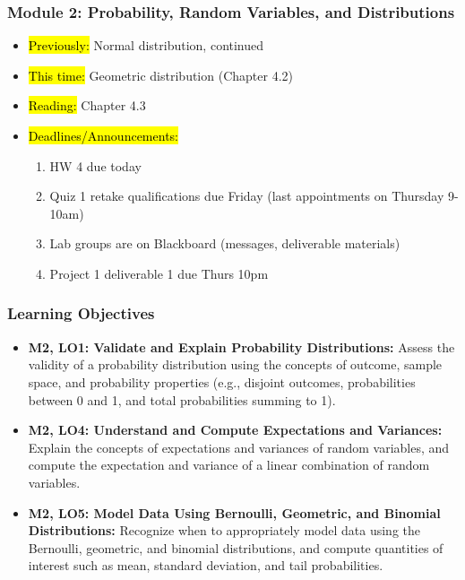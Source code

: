 
\begin{frame}
    \frametitle{Module 2: Probability, Random Variables, and Distributions}
    \begin{itemize}
        \item \hl{Previously: }Normal distribution, continued
        \item \hl{This time: }Geometric distribution (Chapter 4.2)
        \item \hl{Reading: }Chapter 4.3
        \item \hl{Deadlines/Announcements: }
        \begin{enumerate}
            \item HW 4 due today
            \item Quiz 1 retake qualifications due Friday (last appointments on Thursday 9-10am)
            \item Lab groups are on Blackboard (messages, deliverable materials)
            \item Project 1 deliverable 1 due Thurs 10pm
        \end{enumerate}
    \end{itemize}

\end{frame}

\begin{frame}
    \frametitle{Learning Objectives}
    \begin{itemize}
        \item \textbf{M2, LO1: Validate and Explain Probability Distributions:} Assess the validity of a probability distribution using the concepts of outcome, sample space, and probability properties (e.g., disjoint outcomes, probabilities between 0 and 1, and total probabilities summing to 1).
        \item \textbf{M2, LO4: Understand and Compute Expectations and Variances:} Explain the concepts of expectations and variances of random variables, and compute the expectation and variance of a linear combination of random variables.
        \item \textbf{M2, LO5: Model Data Using Bernoulli, Geometric, and Binomial Distributions:} Recognize when to appropriately model data using the Bernoulli, geometric, and binomial distributions, and compute quantities of interest such as mean, standard deviation, and tail probabilities.
    \end{itemize}
\end{frame}
